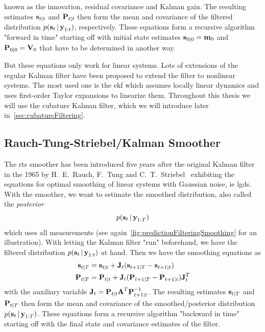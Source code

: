 		known as the innovation, residual covariance and Kalman gain. The resulting estimates \( \boldsymbol{\mathrm{s}}_{t \vert t} \) and \( \boldsymbol{\mathrm{P}}_{t \vert t} \) then form the mean and covariance of the filtered distribution \( p(\boldsymbol{\mathrm{s}}_t \,\vert\, \boldsymbol{\mathrm{y}}_{1:t}) \), respectively. These equations form a recursive algorithm "forward in time" starting off with initial state estimates \( \boldsymbol{\mathrm{s}}_{0 \vert 0} = \boldsymbol{\mathrm{m}}_0 \) and \( \boldsymbol{\mathrm{P}}_{0 \vert 0} = \boldsymbol{\mathrm{V}}_0 \) that have to be determined in another way.

		But these equations only work for linear systems. Lots of extensions of the regular Kalman filter have been proposed to extend the filter to nonlinear systems. The most used one is the \ac{ekf} which assumes locally linear dynamics and uses first-order Taylor expansions to linearize them. Throughout this thesis we will use the cubature Kalman filter, which we will introduce later in~\autoref{sec:cubatureFiltering}.

	\subsection{Rauch-Tung-Striebel/Kalman Smoother}
		The \ac{rts} smoother has been introduced five years after the original Kalman filter in the 1965 by H.~E.~Rauch, F.~Tung and C.~T.~Striebel~\cite{rauchMaximumLikelihoodEstimates1965} exhibiting the equations for optimal smoothing of linear systems with Gaussian noise, \ac{ie} \ac{lgds}. With the smoother, we want to estimate the smoothed distribution, also called the \emph{posterior}
		\begin{equation*}
			p(\boldsymbol{\mathrm{s}}_t \,\vert\, \boldsymbol{\mathrm{y}}_{1:T})
		\end{equation*}
		which uses all measurements (see again~\autoref{fig:predictionFilteringSmoothing} for an illustration). With letting the Kalman filter "run" beforehand, we have the filtered distribution \( p(\boldsymbol{\mathrm{s}}_t \,\vert\, \boldsymbol{\mathrm{y}}_{1:t}) \) at hand. Then we have the smoothing equations as
		\begin{align}
			\boldsymbol{\mathrm{s}}_{t \vert T} &= \boldsymbol{\mathrm{s}}_{t \vert t} + \boldsymbol{\mathrm{J}}_t (\boldsymbol{\mathrm{s}}_{t + 1 \vert T} - \boldsymbol{\mathrm{s}}_{t + 1 \vert t})  \label{eqn:rtsState} \\
			\boldsymbol{\mathrm{P}}_{t \vert T} &= \boldsymbol{\mathrm{P}}_{t \vert t} + \boldsymbol{\mathrm{J}}_t (\boldsymbol{\mathrm{P}}_{t + 1 \vert T} - \boldsymbol{\mathrm{P}}_{t + 1 \vert t}) \boldsymbol{\mathrm{J}}_t^T  \label{eqn:rtsCov}
		\end{align}
		with the auxiliary variable \( \boldsymbol{\mathrm{J}}_t = \boldsymbol{\mathrm{P}}_{t \vert t} \boldsymbol{\mathrm{A}}^T \boldsymbol{\mathrm{P}}_{t + 1 \vert t}^{-1} \). The resulting estimates \( \boldsymbol{\mathrm{s}}_{t \vert T} \) and \( \boldsymbol{\mathrm{P}}_{t \vert T} \) then form the mean and covariance of the smoothed/posterior distribution \( p(\boldsymbol{\mathrm{s}}_t \,\vert\, \boldsymbol{\mathrm{y}}_{1:T}) \). These equations form a recursive algorithm "backward in time" starting off with the final state and covariance estimates of the filter.


